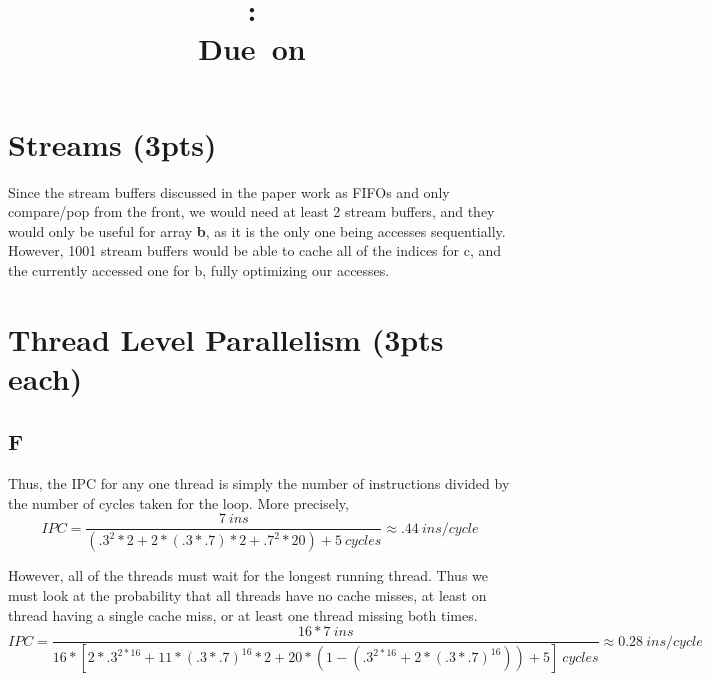 \documentclass{article}
\title{
\vspace{2in}
\textmd{\textbf{\hmwkClass:\ \hmwkTitle}}\\
\normalsize\vspace{0.1in}\small{Due\ on\ \hmwkDueDate}\\
\vspace{0.1in}\large{\textit{\hmwkClassInstructor}}
\vspace{3in}
}
\author{\textbf{\hmwkAuthorName}}
\date{} %
\begin{document}
\maketitle
\newpage




%


\section{Streams (3pts)}
Since the stream buffers discussed in the paper work as FIFOs and only compare/pop from the front, we would need at least 2 stream buffers, and they would only be useful for array \textbf{b}, as it is the only one being accesses sequentially.  However, 1001 stream buffers would be able to cache all of the indices for c, and the currently accessed one for b, fully optimizing our accesses.  


\section{Thread Level Parallelism (3pts each)}

\subsection{F}
Thus, the IPC for any one thread is simply the number of instructions divided by the number of cycles taken for the loop. 
More precisely,
\begin{equation*}
IPC = \frac{7~ins}{(.3^2*2+2*(.3*.7)*2+.7^2*20) +5~cycles} \approx .44~ins/cycle
\end{equation*}

However, all of the threads must wait for the longest running thread.  Thus we must look at the probability that all threads have no cache misses, at least on thread having a single cache miss, or at least one thread missing both times.
\begin{equation*}
IPC = \frac{16*7~ins}{16*[2*.3^{2*16}+11*(.3*.7)^{16}*2+20*(1-(.3^{2*16} + 2*(.3*.7)^{16})) + 5]~cycles} \approx 0.28~ins/cycle
\end{equation*}
\end{document}
